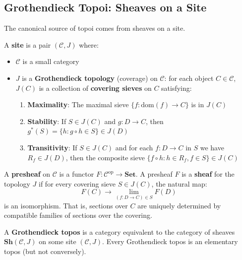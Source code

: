 \subsection{Grothendieck Topoi: Sheaves on a Site}
\label{subsec:grothendieck-topoi}

The canonical source of topoi comes from sheaves on a site.

\begin{definition}[Site]
\label{def:site}
A \textbf{site} is a pair $(\mathcal{C}, J)$ where:
\begin{itemize}
  \item $\mathcal{C}$ is a small category
  \item $J$ is a \textbf{Grothendieck topology} (coverage) on $\mathcal{C}$:
        for each object $C \in \mathcal{C}$, $J(C)$ is a collection of
        \textbf{covering sieves} on $C$ satisfying:
        \begin{enumerate}[label=(J\arabic*)]
          \item \textbf{Maximality}: The maximal sieve $\{f : \mathrm{dom}(f) \to C\}$
                is in $J(C)$
          \item \textbf{Stability}: If $S \in J(C)$ and $g : D \to C$, then
                $g^*(S) = \{h : g \circ h \in S\} \in J(D)$
          \item \textbf{Transitivity}: If $S \in J(C)$ and for each $f : D \to C$
                in $S$ we have $R_f \in J(D)$, then the composite sieve
                $\{f \circ h : h \in R_f, f \in S\} \in J(C)$
        \end{enumerate}
\end{itemize}
\end{definition}

\begin{definition}
\label{def:sheaf-on-site}
A \textbf{presheaf} on $\mathcal{C}$ is a functor $F : \mathcal{C}^{\mathrm{op}} \to \mathbf{Set}$.
A presheaf $F$ is a \textbf{sheaf} for the topology $J$ if for every covering
sieve $S \in J(C)$, the natural map:
\[
  F(C) \to \lim_{(f : D \to C) \in S} F(D)
\]
is an isomorphism. That is, sections over $C$ are uniquely determined by
compatible families of sections over the covering.
\end{definition}

\begin{definition}
\label{def:grothendieck-topos}
A \textbf{Grothendieck topos} is a category equivalent to the category of
sheaves $\mathbf{Sh}(\mathcal{C}, J)$ on some site $(\mathcal{C}, J)$.
Every Grothendieck topos is an elementary topos (but not conversely).
\end{definition}


